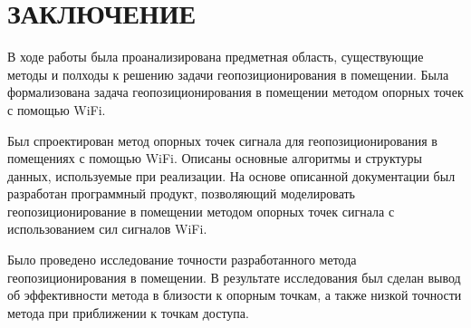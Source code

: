 \chapter*{ЗАКЛЮЧЕНИЕ}

В ходе работы была проанализирована предметная область, существующие методы и полходы к решению задачи геопозиционирования в помещении. Была формализована задача геопозиционирования в помещении методом опорных точек с помощью WiFi.

Был спроектирован метод опорных точек сигнала для геопозиционирования в помещениях с помощью WiFi. Описаны основные алгоритмы и структуры данных, используемые при реализации. На основе описанной документации был разработан программный продукт, позволяющий моделировать геопозиционирование в помещении методом опорных точек сигнала с использованием сил сигналов WiFi.

Было проведено исследование точности разработанного метода геопозиционирования в помещении. В результате исследования был сделан вывод об эффективности метода в близости к опорным точкам, а также низкой точности метода при приближении к точкам доступа.
